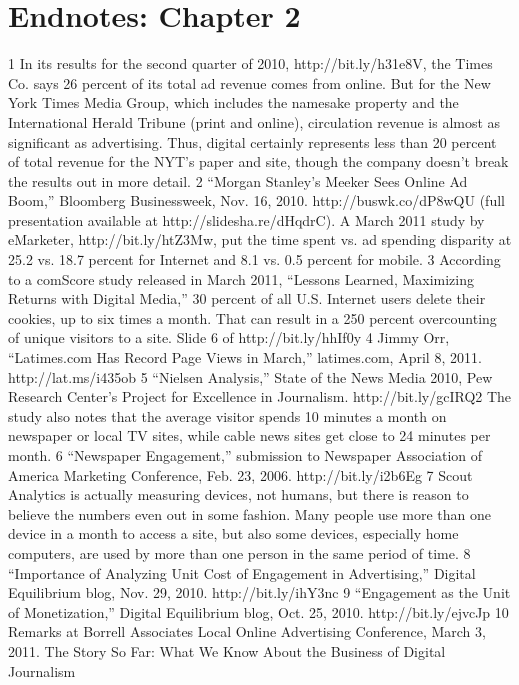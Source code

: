 \section{Endnotes: Chapter 2}
1 In its results for the second quarter of 2010, http://bit.ly/h31e8V, the Times Co. says 26
percent of its total ad revenue comes from online. But for the New York Times Media Group,
which includes the namesake property and the International Herald Tribune (print and
online), circulation revenue is almost as significant as advertising. Thus, digital certainly
represents less than 20 percent of total revenue for the NYT’s paper and site, though the
company doesn’t break the results out in more detail.
2 ``Morgan Stanley’s Meeker Sees Online Ad Boom,'' Bloomberg Businessweek, Nov. 16, 2010.
http://buswk.co/dP8wQU (full presentation available at http://slidesha.re/dHqdrC). A March
2011 study by eMarketer, http://bit.ly/htZ3Mw, put the time spent vs. ad spending disparity
at 25.2 vs. 18.7 percent for Internet and 8.1 vs. 0.5 percent for mobile.
3 According to a comScore study released in March 2011, ``Lessons Learned, Maximizing
Returns with Digital Media,'' 30 percent of all U.S. Internet users delete their cookies, up to
six times a month. That can result in a 250 percent overcounting of unique visitors to a site.
Slide 6 of http://bit.ly/hhIf0y
4 Jimmy Orr, ``Latimes.com Has Record Page Views in March,'' latimes.com, April 8, 2011.
http://lat.ms/i435ob
5 ``Nielsen Analysis,'' State of the News Media 2010, Pew Research Center’s Project for
Excellence in Journalism. http://bit.ly/gcIRQ2 The study also notes that the average visitor
spends 10 minutes a month on newspaper or local TV sites, while cable news sites get close
to 24 minutes per month.
6 ``Newspaper Engagement,'' submission to Newspaper Association of America Marketing
Conference, Feb. 23, 2006. http://bit.ly/i2b6Eg
7 Scout Analytics is actually measuring devices, not humans, but there is reason to believe the
numbers even out in some fashion. Many people use more than one device in a month to
access a site, but also some devices, especially home computers, are used by more than one
person in the same period of time.
8 ``Importance of Analyzing Unit Cost of Engagement in Advertising,'' Digital Equilibrium blog,
Nov. 29, 2010. http://bit.ly/ihY3nc
9 ``Engagement as the Unit of Monetization,'' Digital Equilibrium blog, Oct. 25, 2010.
http://bit.ly/ejvcJp
10 Remarks at Borrell Associates Local Online Advertising Conference, March 3, 2011.
The Story So Far: What We Know About the Business of Digital Journalism
